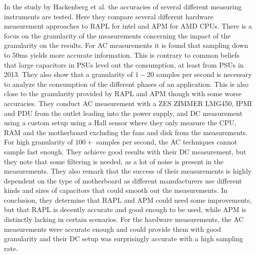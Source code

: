 In the study by Hackenberg et al.\cite{hackenberg2013} the accuracies of several different measuring instruments are tested. Here they compare several different hardware measurement approaches to RAPL for intel and APM for AMD CPUs. There is a focus on the granularity of the measurements concerning the impact of the granularity on the results. For AC measurements it is found that sampling down to 50ms yields more accurate information. This is contrary to common beliefs that large capacitors in PSUs level out the consumption, at least from PSUs in 2013. They also show that a granularity of $1-20$ samples per second is necessary to analyze the consumption of the different phases of an application. This is also close to the granularity provided by RAPL  and APM though with some worse accuracies. They conduct AC measurement with a ZES ZIMMER LMG450, IPMI and PDU from the outlet leading into the power supply, and DC measurement using a custom setup using a Hall sensor where they only measure the CPU, RAM and the motherboard excluding the fans and disk from the measurements. For high granularity of $100+$ samples per second, the AC techniques cannot sample fast enough. They achieve good results with their DC measurement, but they note that some filtering is needed, as a lot of noise is present in the measurements. They also remark that the success of their measurements is highly dependent on the type of motherboard as different manufacturers use different kinds and sizes of capacitors that could smooth out the measurements. In conclusion, they determine that RAPL and APM could need some improvements, but that RAPL is decently accurate and good enough to be used, while APM is distinctly lacking in certain scenarios. For the hardware measurements, the AC measurements were accurate enough and could provide them with good granularity and their DC setup was surprisingly accurate with a high sampling rate.\cite*{hackenberg2013}\newline
